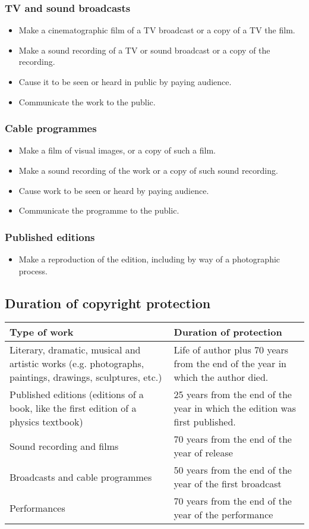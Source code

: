 \documentclass[11pt]{article}
\begin{document}
\subsubsection{TV and sound broadcasts}
\label{sec:orgc87654b}
\begin{itemize}
\item Make a cinematographic film of a TV broadcast or a copy of a TV the film.
\item Make a sound recording of a TV or sound broadcast or a copy of the recording.
\item Cause it to be seen or heard in public by paying audience.
\item Communicate the work to the public.
\end{itemize}
\subsubsection{Cable programmes}
\label{sec:org47330cb}
\begin{itemize}
\item Make a film of visual images, or a copy of such a film.
\item Make a sound recording of the work or a copy of such sound recording.
\item Cause work to be seen or heard by paying audience.
\item Communicate the programme to the public.
\end{itemize}
\subsubsection{Published editions}
\label{sec:org7af1832}
\begin{itemize}
\item Make a reproduction of the edition, including by way of a photographic process.
\end{itemize}

\clearpage
\subsection{Duration of copyright protection}
\label{sec:org8bc06ed}
\begin{center}
\begin{tabular}{m{16em}|m{16em}}
Type of work & Duration of protection\\
\hline
Literary, dramatic, musical and artistic works (e.g. photographs, paintings, drawings, sculptures, etc.) & Life of author plus 70 years from the end of the year in which the author died.\\
\hline
Published editions (editions of a book, like the first edition of a physics textbook) & 25 years from the end of the year in which the edition was first published.\\
\hline
Sound recording and films & 70 years from the end of the year of release\\
\hline
Broadcasts and cable programmes & 50 years from the end of the year of the first broadcast\\
\hline
Performances & 70 years from the end of the year of the performance\\
\end{tabular}
\end{center}
\end{document}
